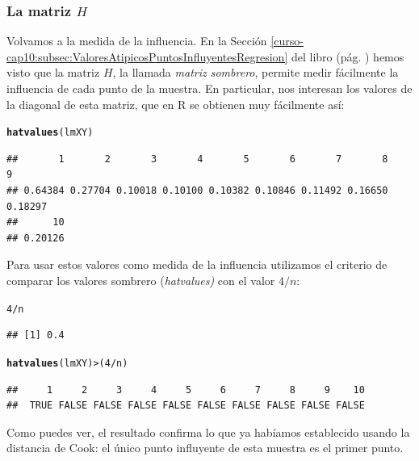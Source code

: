 \documentclass[10pt,a4paper]{article}\usepackage[]{graphicx}\usepackage[]{color}
\makeatletter
\newcommand{\hlnum}[1]{\textcolor[rgb]{0.686,0.059,0.569}{#1}}%
\newcommand{\hlopt}[1]{\textcolor[rgb]{0,0,0}{#1}}%
\newcommand{\hlstd}[1]{\textcolor[rgb]{0.345,0.345,0.345}{#1}}%
\newcommand{\hlkwd}[1]{\textcolor[rgb]{0.737,0.353,0.396}{\textbf{#1}}}%
\newenvironment{kframe}{%
 \def\at@end@of@kframe{}%
 \ifinner\ifhmode%
  \def\at@end@of@kframe{\end{minipage}}%
  \begin{minipage}{\columnwidth}%
 \fi\fi%
 \def\FrameCommand##1{\hskip\@totalleftmargin \hskip-\fboxsep
 \colorbox{shadecolor}{##1}\hskip-\fboxsep
     \hskip-\linewidth \hskip-\@totalleftmargin \hskip\columnwidth}%
 \MakeFramed {\advance\hsize-\width
   \@totalleftmargin\z@ \linewidth\hsize
   \@setminipage}}%
 {\par\unskip\endMakeFramed%
 \at@end@of@kframe}
\newenvironment{knitrout}{}{} %
\makeatother
\begin{document}
\subsubsection*{La matriz $H$}

Volvamos a la medida de la influencia. En la Sección \ref{curso-cap10:subsec:ValoresAtipicosPuntosInfluyentesRegresion} del libro (pág. \pageref{curso-cap10:subsec:ValoresAtipicosPuntosInfluyentesRegresion}) hemos visto que la matriz $H$, la llamada {\em matriz sombrero}, permite medir fácilmente la influencia de cada punto de la muestra. En particular, nos interesan los valores de la diagonal de esta matriz, que en R se obtienen muy fácilmente así:
\begin{knitrout}
\color{fgcolor}\begin{kframe}
\begin{alltt}
\hlkwd{hatvalues}\hlstd{(lmXY)}
\end{alltt}
\begin{verbatim}
##       1       2       3       4       5       6       7       8       9 
## 0.64384 0.27704 0.10018 0.10100 0.10382 0.10846 0.11492 0.16650 0.18297 
##      10 
## 0.20126
\end{verbatim}
\end{kframe}
\end{knitrout}
Para usar estos valores como medida de la influencia utilizamos el  criterio de comparar los valores sombrero {(\em hatvalues)} con el valor $4/n$:
\begin{knitrout}
\color{fgcolor}\begin{kframe}
\begin{alltt}
\hlnum{4}\hlopt{/}\hlstd{n}
\end{alltt}
\begin{verbatim}
## [1] 0.4
\end{verbatim}
\begin{alltt}
\hlkwd{hatvalues}\hlstd{(lmXY)} \hlopt{>} \hlstd{(}\hlnum{4} \hlopt{/} \hlstd{n)}
\end{alltt}
\begin{verbatim}
##     1     2     3     4     5     6     7     8     9    10 
##  TRUE FALSE FALSE FALSE FALSE FALSE FALSE FALSE FALSE FALSE
\end{verbatim}
\end{kframe}
\end{knitrout}
Como puedes ver, el resultado confirma lo que ya habíamos establecido usando la distancia de Cook: el único punto influyente de esta muestra es el primer punto.
\end{document}
